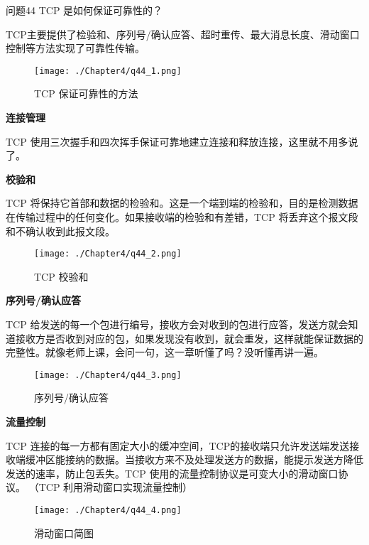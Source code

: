 \documentclass[cn,11pt,color=blue,lang=cn]{elegantbook}
\begin{document}
\begin{custom}{问题44}
TCP 是如何保证可靠性的？
\end{custom}
\begin{solution}
TCP主要提供了检验和、序列号/确认应答、超时重传、最大消息长度、滑动窗口控制等方法实现了可靠性传输。
\begin{figure}[htbp]
\centering
\texttt{[image: ./Chapter4/q44\_1.png]}
\caption{TCP 保证可靠性的方法}
\label{fig44_1}
\end{figure}

\begin{note} \textbf{连接管理} \end{note}
TCP 使用三次握手和四次挥手保证可靠地建立连接和释放连接，这里就不用多说了。

\begin{note} \textbf{校验和} \end{note}
TCP 将保持它首部和数据的检验和。这是一个端到端的检验和，目的是检测数据在传输过程中的任何变化。如果接收端的检验和有差错，TCP 将丢弃这个报文段和不确认收到此报文段。
\begin{figure}[htbp]
\centering
\texttt{[image: ./Chapter4/q44\_2.png]}
\caption{TCP 校验和}
\label{fig44_2}
\end{figure}

\newpage
\begin{note} \textbf{序列号/确认应答} \end{note}
TCP 给发送的每一个包进行编号，接收方会对收到的包进行应答，发送方就会知道接收方是否收到对应的包，如果发现没有收到，就会重发，这样就能保证数据的完整性。就像老师上课，会问一句，这一章听懂了吗？没听懂再讲一遍。

\begin{figure}[htbp]
\centering
\texttt{[image: ./Chapter4/q44\_3.png]}
\caption{序列号/确认应答}
\label{fig44_3}
\end{figure}

\begin{note} \textbf{流量控制} \end{note}
TCP 连接的每一方都有固定大小的缓冲空间，TCP的接收端只允许发送端发送接收端缓冲区能接纳的数据。当接收方来不及处理发送方的数据，能提示发送方降低发送的速率，防止包丢失。TCP 使用的流量控制协议是可变大小的滑动窗口协议。 （TCP 利用滑动窗口实现流量控制）
\begin{figure}[htbp]
\centering
\texttt{[image: ./Chapter4/q44\_4.png]}
\caption{滑动窗口简图}
\label{fig44_4}
\end{figure}


\end{solution}
\end{document}
